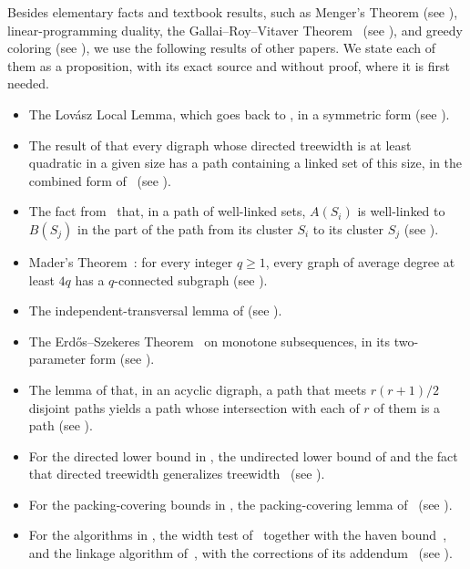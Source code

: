 \documentclass[fontsize=12pt,leading=14pt]{fullpaper}
\begin{document}
Besides elementary facts and textbook results, such as Menger's Theorem (see ), linear-programming duality, the Gallai--Roy--Vitaver Theorem~\cite{Gallai68,Roy67,Vitaver62} (see ), and greedy coloring (see ), we use the following results of other papers.
We state each of them as a proposition, with its exact source and without proof, where it is first needed.
\begin{itemize}
  \item The Lov\'asz Local Lemma, which goes back to \textcite{ErdosLovasz75}, in a symmetric form (see ).
  \item The result of \textcite{CLMS22} that every digraph whose directed treewidth is at least quadratic in a given size has a path containing a linked set of this size, in the combined form of~\cite[Proposition~3.5]{CLNS26} (see ).
  \item The fact from~\cite[Lemma~8.4]{HKMM26a} that, in a path of well-linked sets, $A(S_i)$ is well-linked to $B(S_j)$ in the part of the path from its cluster $S_i$ to its cluster $S_j$ (see ).
  \item Mader's Theorem~\cite{Mader72}: for every integer $q\ge1$, every graph of average degree at least $4q$ has a $q$-connected subgraph (see ).
  \item The independent-transversal lemma of \textcite[Lemma~4.2]{RW12} (see ).
  \item The Erd\H{o}s--Szekeres Theorem~\cite{ErdosSzekeres35} on monotone subsequences, in its two-parameter form (see ).
  \item The lemma of \textcite[(4.6)]{ReedRST96} that, in an acyclic digraph, a path that meets $r(r+1)/2$ disjoint paths yields a path whose intersection with each of $r$ of them is a path (see ).
  \item For the directed lower bound in , the undirected lower bound of \textcite{RST94} and the fact that directed treewidth generalizes treewidth~\cite[(2.1)]{Johnson2001} (see ).
  \item For the packing-covering bounds in , the packing-covering lemma of~\cite[Lemma~4.2]{AKKW16} (see ).
  \item For the algorithms in , the width test of~\cite[Theorem~2.19]{CLMS22} together with the haven bound~\cite[(3.1)]{Johnson2001}, and the linkage algorithm of~\cite[(4.8)]{Johnson2001}, with the corrections of its addendum~\cite{JRSTadd} (see ).
\end{itemize}
\end{document}
